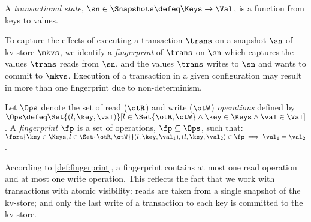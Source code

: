 \begin{definition}
\label{def:heaps}
A \emph{transactional state}, \( \sn \in \Snapshots \defeq \Keys \to
\Val\),  is a function from keys to values.
\end{definition}


To capture the effects of executing a transaction $\trans$ on a snapshot $\sn$ of kv-store $\mkvs$, 
we identify a \emph{fingerprint}  of $\trans$ on $\sn$ which captures
 the values $\trans$ reads from $\sn$, and
the values $\trans$ writes to $\sn$ and wants to commit to $\mkvs$. 
Execution of a transaction in a given configuration may result in more than one fingerprint due to non-determinism. 

\begin{definition}[Fingerprints]
\label{beebop}
\label{def:fingerprint}
Let \( \Ops\) denote the set of read (\( \otR\)) and write (\(\otW\)) \emph{operations} defined by 
$\Ops \defeq \Set{(l, \key, \val) }[ l \in \Set{\otR, \otW} \land \key \in \Keys \land \val \in \Val ]$.
A \emph{fingerprint} $\fp$ is a set of operations, $\fp \subseteq \Ops$,
such that: 
$\fora{\key \in \Keys, l  \in \Set{\otR, \otW}}
	(l, \key, \val_1), (l, \key, \val_2) \in \fp \implies \val_1 = \val_2$.
\end{definition}
\noindent 
According to \cref{def:fingerprint}, a fingerprint contains at most one read operation and at most one write operation. 
This reflects the fact that we work with transactions with 
atomic visibility: reads are taken from a single snapshot of the kv-store;
and 
only the last write of a transaction to each key is committed to the kv-store.
